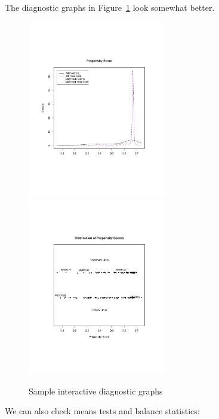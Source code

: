\documentclass[oneside,letterpaper,titlepage]{article}
\begin{document}
The diagnostic graphs in Figure~\ref{f2diags_replace} look somewhat better. 

\begin{figure}[h]
  \begin{center}
    \includegraphics[width=2.35in,angle=0]{figs/f2pscore_r}
    \includegraphics[width=2.35in,angle=0]{figs/f2pjitter_r}
    \hfill
    \caption{Sample interactive diagnostic graphs}
    \label{f2diags_replace}
  \end{center}
\end{figure}

We can also check means tests and balance statistics:
\end{document}
